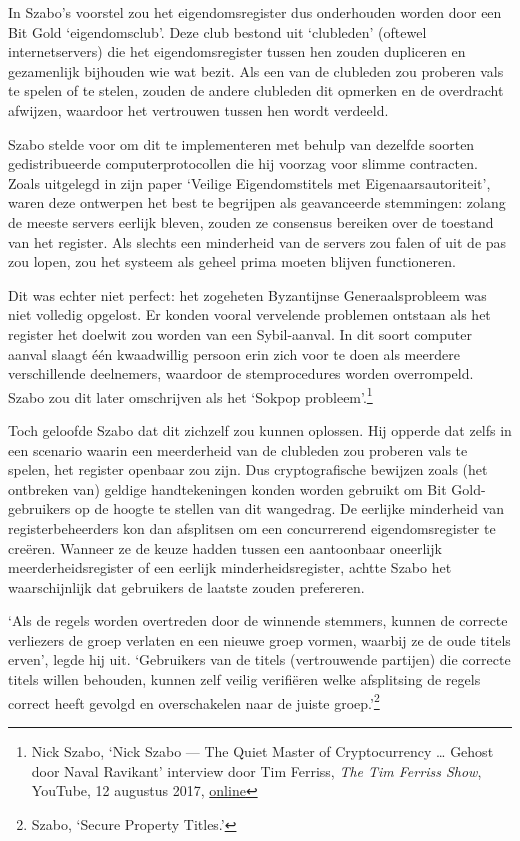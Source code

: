 \documentclass[smalldemyvopaper,11pt,twoside,onecolumn,openright,extrafontsizes,hidelinks]{memoir}
\begin{document}
In Szabo's voorstel zou het eigendomsregister dus onderhouden worden
door een Bit Gold `eigendomsclub'. Deze club bestond uit `clubleden'
(oftewel internetservers) die het eigendomsregister tussen hen zouden
dupliceren en gezamenlijk bijhouden wie wat bezit. Als een van de
clubleden zou proberen vals te spelen of te stelen, zouden de andere
clubleden dit opmerken en de overdracht afwijzen, waardoor het
vertrouwen tussen hen wordt verdeeld.

Szabo stelde voor om dit te implementeren met behulp van dezelfde
soorten gedistribueerde computerprotocollen die hij voorzag voor slimme
contracten. Zoals uitgelegd in zijn paper `Veilige Eigendomstitels met
Eigenaarsautoriteit', waren deze ontwerpen het best te begrijpen als
geavanceerde stemmingen: zolang de meeste servers eerlijk bleven, zouden
ze consensus bereiken over de toestand van het register. Als slechts een
minderheid van de servers zou falen of uit de pas zou lopen, zou het
systeem als geheel prima moeten blijven functioneren.

Dit was echter niet perfect: het zogeheten Byzantijnse Generaalsprobleem
was niet volledig opgelost. Er konden vooral vervelende problemen
ontstaan als het register het doelwit zou worden van een Sybil-aanval.
In dit soort computer aanval slaagt één kwaadwillig persoon erin zich
voor te doen als meerdere verschillende deelnemers, waardoor de
stemprocedures worden overrompeld. Szabo zou dit later omschrijven als
het `Sokpop probleem'.\footnote{Nick Szabo, `Nick Szabo --- The Quiet
  Master of Cryptocurrency \ldots{} Gehost door Naval Ravikant'
  interview door Tim Ferriss, \emph{The Tim Ferriss Show}, YouTube, 12
  augustus 2017,
  \href{https://www.youtube.com/watch?v=3FA3UjA0igY}{online}}

Toch geloofde Szabo dat dit zichzelf zou kunnen oplossen. Hij opperde
dat zelfs in een scenario waarin een meerderheid van de clubleden zou
proberen vals te spelen, het register openbaar zou zijn. Dus
cryptografische bewijzen zoals (het ontbreken van) geldige
handtekeningen konden worden gebruikt om Bit Gold-gebruikers op de
hoogte te stellen van dit wangedrag. De eerlijke minderheid van
registerbeheerders kon dan afsplitsen om een concurrerend
eigendomsregister te creëren. Wanneer ze de keuze hadden tussen een
aantoonbaar oneerlijk meerderheidsregister of een eerlijk
minderheidsregister, achtte Szabo het waarschijnlijk dat gebruikers de
laatste zouden prefereren.

`Als de regels worden overtreden door de winnende stemmers, kunnen de
correcte verliezers de groep verlaten en een nieuwe groep vormen,
waarbij ze de oude titels erven', legde hij uit. `Gebruikers van de
titels (vertrouwende partijen) die correcte titels willen behouden,
kunnen zelf veilig verifiëren welke afsplitsing de regels correct heeft
gevolgd en overschakelen naar de juiste groep.'\footnote{Szabo, `Secure
  Property Titles.'}
\end{document}
